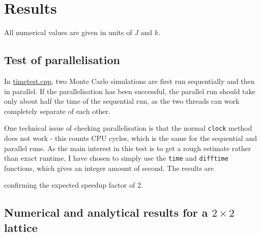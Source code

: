 \documentclass[12pt,english,a4paper]{article}
\newcommand{\program}[1]{\href{https://github.com/anjohan/Offentlig/blob/master/FYS3150/Oblig4/#1}{#1}}
\begin{document}
\section{Results}
All numerical values are given in units of \(J\) and \(k\).

\subsection{Test of parallelisation}
In \program{timetest.cpp}, two Monte Carlo simulations are first run sequentially and then in parallel. If the parallelisation has been successful, the parallel run should take only about half the time of the sequential run, as the two threads can work completely separate of each other.

One technical issue of checking parallelisation is that the normal \texttt{clock} method does not work - this counts CPU cycles, which is the same for the sequential and parallel runs. As the main interest in this test is to get a rough estimate rather than exact runtime, I have chosen to simply use the \texttt{time} and \texttt{difftime} functions, which gives an integer amount of second. The results are

confirming the expected speedup factor of \(2\).

\subsection{Numerical and analytical results for a \(2\times2\) lattice}

\end{document}

